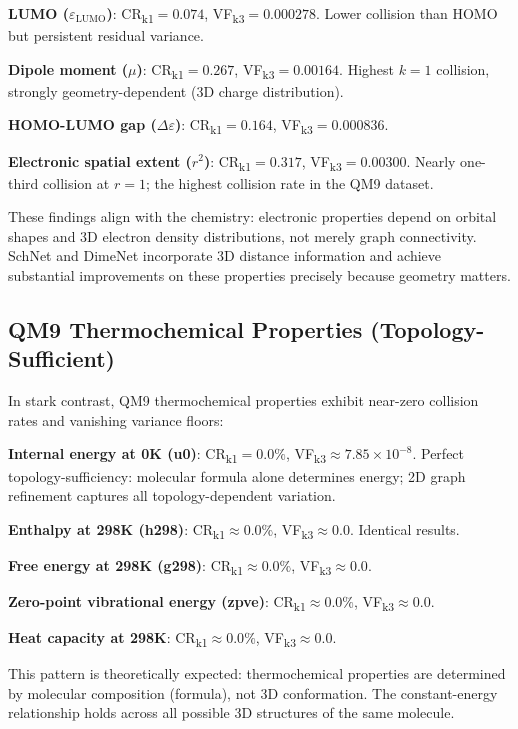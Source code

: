\documentclass[11pt,letterpaper]{article}
\begin{document}
\textbf{LUMO ($\varepsilon_{\mathrm{LUMO}}$)}: CR\textsubscript{k1}$= 0.074$, VF\textsubscript{k3}$= 0.000278$. Lower collision than HOMO but persistent residual variance.

\textbf{Dipole moment ($\mu$)}: CR\textsubscript{k1}$= 0.267$, VF\textsubscript{k3}$= 0.00164$. Highest $k=1$ collision, strongly geometry-dependent (3D charge distribution).

\textbf{HOMO-LUMO gap ($\Delta\varepsilon$)}: CR\textsubscript{k1}$= 0.164$, VF\textsubscript{k3}$= 0.000836$.

\textbf{Electronic spatial extent ($r^2$)}: CR\textsubscript{k1}$= 0.317$, VF\textsubscript{k3}$= 0.00300$. Nearly one-third collision at $r=1$; the highest collision rate in the QM9 dataset.

These findings align with the chemistry: electronic properties depend on orbital shapes and 3D electron density distributions, not merely graph connectivity. SchNet and DimeNet incorporate 3D distance information and achieve substantial improvements on these properties precisely because geometry matters.

\subsection{QM9 Thermochemical Properties (Topology-Sufficient)}

In stark contrast, QM9 thermochemical properties exhibit near-zero collision rates and vanishing variance floors:

\textbf{Internal energy at 0K (u0)}: CR\textsubscript{k1}$= 0.0\%$, VF\textsubscript{k3}$\approx 7.85\times10^{-8}$. Perfect topology-sufficiency: molecular formula alone determines energy; 2D graph refinement captures all topology-dependent variation.

\textbf{Enthalpy at 298K (h298)}: CR\textsubscript{k1}$\approx 0.0\%$, VF\textsubscript{k3}$\approx 0.0$. Identical results.

\textbf{Free energy at 298K (g298)}: CR\textsubscript{k1}$\approx 0.0\%$, VF\textsubscript{k3}$\approx 0.0$.

\textbf{Zero-point vibrational energy (zpve)}: CR\textsubscript{k1}$\approx 0.0\%$, VF\textsubscript{k3}$\approx 0.0$.

\textbf{Heat capacity at 298K}: CR\textsubscript{k1}$\approx 0.0\%$, VF\textsubscript{k3}$\approx 0.0$.

This pattern is theoretically expected: thermochemical properties are determined by molecular composition (formula), not 3D conformation. The constant-energy relationship holds across all possible 3D structures of the same molecule.
\end{document}
